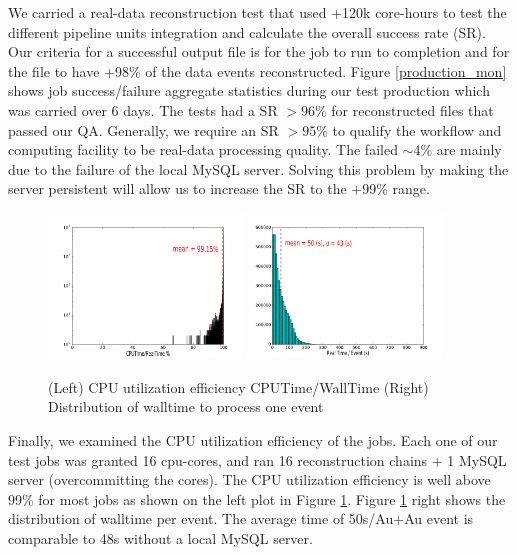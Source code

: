 \documentclass[a4paper]{jpconf}
\begin{document}
We carried a real-data reconstruction test that used +120k core-hours to test
the different pipeline units integration and calculate the overall success
rate (SR). Our criteria for a successful output file is for the job to run to 
completion and for the file to have +98\% of the data events
reconstructed.  Figure \ref{production_mon} shows job success/failure aggregate
statistics during our test production which was carried over 6 days. The tests
had a SR $> 96\%$ for reconstructed files that passed our QA. Generally, we
require an SR $> 95\%$ to qualify the workflow and computing facility
to be real-data processing quality. The failed $\sim$4\% are mainly due to the
failure of the local MySQL server. Solving this problem by making the server
persistent will allow us to increase the SR to the +99\% range.

\begin{figure}[h]
  \includegraphics[width=0.46\textwidth]{eff}
  \includegraphics[width=0.46\textwidth]{time_per_event}
  \caption{\label{performance} (Left) CPU utilization efficiency
  CPUTime/WallTime (Right) Distribution of walltime to process one event}
\end{figure}

Finally, we examined the CPU utilization efficiency of the jobs.
Each one of our test jobs was granted 16 cpu-cores, and ran 16 reconstruction
chains + 1 MySQL server (overcommitting the cores). The CPU utilization
efficiency is well above 99\% for most jobs as shown on the left plot in Figure
\ref{performance}. Figure \ref{performance} right shows the distribution of
walltime per event. The average time of 50s/Au+Au event is comparable to 48s
without a local MySQL server. 
\end{document}

